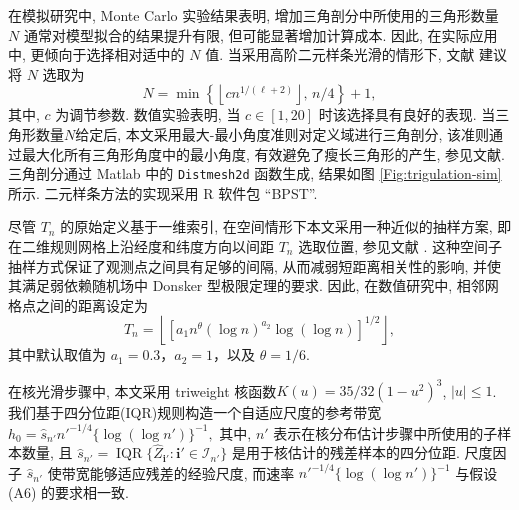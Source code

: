 \documentclass[a4paper,openay,14pt]{ctexbook}
\numberwithin{equation}{section}
\numberwithin{lem}{section}
\begin{document}
在模拟研究中, Monte Carlo 实验结果表明, 增加三角剖分中所使用的三角形数量 \(N\) 通常对模型拟合的结果提升有限, 但可能显著增加计算成本. 因此, 在实际应用中, 更倾向于选择相对适中的 \(N\) 值. 当采用高阶二元样条光滑的情形下, 文献 \cite{yu2019estimation} 建议将 $N$ 选取为
\[
N = \min \left\{ \left\lfloor c n^{1/(\ell+2)} \right\rfloor, \, n/4 \right\} + 1,
\]
其中, $c$ 为调节参数. 数值实验表明, 当 $c \in [1, 20]$ 时该选择具有良好的表现. 当三角形数量$N$给定后, 本文采用最大-最小角度准则对定义域进行三角剖分, 该准则通过最大化所有三角形角度中的最小角度, 有效避免了瘦长三角形的产生, 参见文献\cite{lai2007spline}. 三角剖分通过 Matlab 中的 \texttt{Distmesh2d} 函数生成, 结果如图 \ref{Fig:trigulation-sim} 所示. 二元样条方法的实现采用 R 软件包 ``BPST''.

尽管 $T_n$ 的原始定义基于一维索引, 在空间情形下本文采用一种近似的抽样方案, 即在二维规则网格上沿经度和纬度方向以间距 $T_n$ 选取位置, 参见文献 \cite{lu2014nonparametric}. 这种空间子抽样方式保证了观测点之间具有足够的间隔, 从而减弱短距离相关性的影响, 并使其满足弱依赖随机场中 Donsker 型极限定理的要求. 因此, 在数值研究中, 相邻网格点之间的距离设定为
\[
T_n = \left\lfloor \left[ a_1 n^\theta (\log n)^{a_2} \log(\log n) \right]^{1/2} \right\rfloor,
\]
其中默认取值为 $a_1 = 0.3$，$a_2 = 1$，以及 $\theta = 1/6$.

在核光滑步骤中, 本文采用 triweight 核函数$K(u) = 35/32(1 - u^2)^3$, $|u| \leq 1$. 我们基于四分位距(IQR)规则构造一个自适应尺度的参考带宽
\(h_0 = \hat{s}_{n'} n'^{-1/4} \{\log(\log n')\}^{-1},\)
其中, \(n'\) 表示在核分布估计步骤中所使用的子样本数量, 且
\(\hat{s}_{n'} = \operatorname{IQR} \{\hat Z_{\mathbf i'}:\mathbf i'\in\mathcal I_{n'}\}\)
是用于核估计的残差样本的四分位距. 尺度因子 \(\hat{s}_{n'}\) 使带宽能够适应残差的经验尺度, 而速率 \(n'^{-1/4}\{\log(\log n')\}^{-1}\) 与假设 (A6) 的要求相一致.
\end{document}
